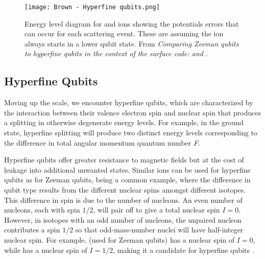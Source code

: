 \begin{figure}[!htb]
    \texttt{[image: Brown - Hyperfine qubits.png]}
    \caption{Energy level diagram for  and  ions showing the potentials errors that can occur for each scattering event. These are assuming the ion always starts in a lower qubit state. From \textit{Comparing Zeeman qubits to hyperfine qubits in the context of the surface code:  and } \cite{Brown}.}
    \label{fig:Yb qubit}
\end{figure}

\subsection{Hyperfine Qubits}
Moving up the scale, we encounter hyperfine qubits, which are characterized by the interaction between their valence electron spin and nuclear spin that produces a splitting in otherwise degenerate energy levels. For example, in the  ground state, hyperfine splitting will produce two distinct energy levels corresponding to the difference in total angular momentum quantum number \textit{F}. 

Hyperfine qubits offer greater resistance to magnetic fields but at the cost of leakage into additional unwanted states. Similar ions can be used for hyperfine qubits as for Zeeman qubits,  being a common example, where the difference in qubit type results from the different nuclear spins amongst different isotopes. This difference in spin is due to the number of nucleons. An even number of nucleons, each with spin $1/2$, will pair off to give a total nuclear spin $I=0$. However, in isotopes with an odd number of nucleons, the unpaired nucleon contributes a spin $1/2$ so that odd-mass-number nuclei will have half-integer nuclear spin. For example,  (used for Zeeman qubits) has a nuclear spin of $I = 0$, while  has a nuclear spin of $I = 1/2$, making it a candidate for hyperfine qubits \cite{Brown}. 

